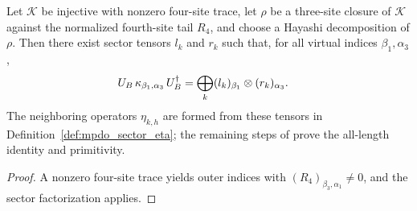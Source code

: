 \begin{theorem}
    \label{thm:mpdo_exists_sector_factorization}
    \leanok
    Let $\mathcal K$ be injective with nonzero four-site trace, let $\rho$ be a
    three-site closure of $\mathcal K$ against the normalized fourth-site tail
    $R_4$, and choose a Hayashi decomposition of $\rho$. Then there exist
    sector tensors $l_k$ and $r_k$ such that, for all virtual indices
    $\beta_1,\alpha_3$,
    \begin{align}
        U_B\,\kappa_{\beta_1,\alpha_3}\,U_B^\dagger
         & =\bigoplus_k
        (l_k)_{\beta_1}\otimes(r_k)_{\alpha_3}.
        \notag
    \end{align}
    The neighboring operators $\eta_{k,h}$ are formed from these tensors
    in Definition~\ref{def:mpdo_sector_eta}; the remaining steps of
    \cite[Appendix~C.2, Lemma~C.4]{Cirac2016MPDO_arXiv} prove the
    all-length identity and primitivity.
\end{theorem}

\begin{proof}
    \leanok
    A nonzero four-site trace yields outer indices with
    $(R_4)_{\beta_3,\alpha_1}\ne0$, and the sector factorization applies.
\end{proof}
